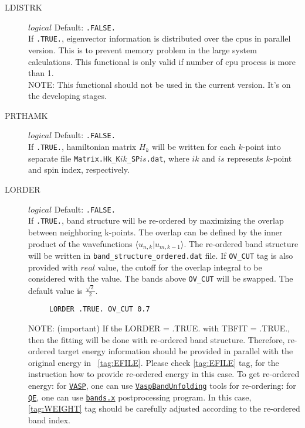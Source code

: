 \documentclass[a4paper,12pt]{scrartcl}
\makeatletter
\def\namedlabel#1#2{\begingroup
    #2%
    \def\@currentlabel{#2}%
    \phantomsection\label{#1}\endgroup
}
\makeatother
\begin{document}
\begin{description}
    \item[\namedlabel{tag:LDISTRK}{LDISTRK}] $logical$ Default: \texttt{.FALSE.} \\
		If \texttt{.TRUE.}, eigenvector information is distributed over the cpus in parallel version.
		This is to prevent memory problem in the large system calculations. 
		This functional is only valid if number of cpu process is more than 1.\\
		NOTE: This functional should not be used in the current version. It's on the developing stages.


    \item[\namedlabel{tag:PRTHAMK}{PRTHAMK}] $logical$ Default: \texttt{.FALSE.} \\
		If \texttt{.TRUE.}, hamiltonian matrix $H_k$ will be written for each $k$-point into separate file \texttt{Matrix.Hk\_K$ik$\_SP$is$.dat}, where $ik$ and $is$ represents $k$-point and spin index, respectively.

    \item[\namedlabel{tag:LORDER}{LORDER}] $logical$ Default: \texttt{.FALSE.}  \\
		If \texttt{.TRUE.}, band structure will be re-ordered
        by maximizing the overlap between neighboring k-points. The overlap can be defined by the inner product of the wavefunctions $\langle u_{n,k} | u_{m,k-1} \rangle$. 
        The re-ordered band structure will be written in \texttt{band\_structure\_ordered.dat} file.
        If \texttt{OV\_CUT} tag is also provided with $real$ value, the cutoff for the overlap integral to be considered with the value. The bands above \texttt{OV\_CUT} will be swapped. The default value is $\frac{\sqrt{2}}{2}$. 
           
      \begin{verbatim}
     LORDER .TRUE. OV_CUT 0.7  
     \end{verbatim}
     
     NOTE: (important) If the LORDER = .TRUE. with TBFIT = .TRUE., then the fitting will be done with re-ordered band structure. Therefore, re-ordered target energy information should be provided in parallel with the original energy  in ~\ref{tag:EFILE}. Please check \ref{tag:EFILE} tag, for the instruction how to provide re-ordered energy in this case. To get re-ordered energy: for \href{https://www.vasp.at}{\texttt{VASP}}, one can use \href{https://github.com/QijingZheng/VaspBandUnfolding}{\texttt{VaspBandUnfolding}} tools for re-ordering: for \href{https://www.quantum-espresso.org}{\texttt{QE}}, one can use \href{https://www.quantum-espresso.org/Doc/INPUT_BANDS.html}{\texttt{bands.x}} postprocessing program. 
     	In this case, \ref{tag:WEIGHT} tag should be carefully adjusted according to the re-ordered band index.
        


\end{description}
\end{document}
